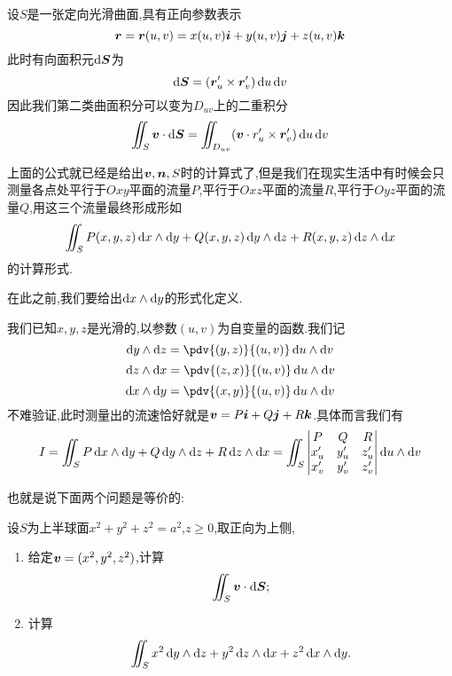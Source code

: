 设$S$是一张定向光滑曲面,具有正向参数表示
$$\bm{r} = \bm{r}(u,v) = x(u,v) \bm{i} + y(u,v) \bm{j} + z(u,v) \bm{k}$$
此时有向面积元$\operatorname{d\!} \bm{S}$为
$$\operatorname{d\!} \bm{S} = (\bm{r}_u' \times \bm{r}_v') \operatorname{d\!} u \operatorname{d\!} v$$
因此我们第二类曲面积分可以变为$D_{uv}$上的二重积分
$$\iint_S \bm{v} \cdot \operatorname{d\!} \bm{S} = \iint_{D_{uv}} ( \bm{v} \cdot r_u' \times \bm{r}_v') \operatorname{d\!} u \operatorname{d\!} v$$

\begin{remark}
    上面的公式就已经是给出$\bm{v},\bm{n},S$时的计算式了,但是我们在现实生活中有时候会只测量各点处平行于$Oxy$平面的流量$P$,平行于$Oxz$平面的流量$R$,平行于$Oyz$平面的流量$Q$,用这三个流量最终形成形如
    $$\iint_S P(x,y,z) \operatorname{d\!} x \wedge \operatorname{d\!} y + Q(x,y,z) \operatorname{d\!} y \wedge \operatorname{d\!} z + R(x,y,z) \operatorname{d\!} z \wedge \operatorname{d\!} x$$的计算形式.

    在此之前,我们要给出$\operatorname{d\!} x \wedge \operatorname{d\!} y$的形式化定义.
\end{remark}

我们已知$x,y,z$是光滑的,以参数$(u,v)$为自变量的函数.我们记
$$\dif y \wedge \dif z = \pdv{(y,z)}{(u,v)} \dif u \wedge \dif v$$
$$\dif z \wedge \dif x = \pdv{(z,x)}{(u,v)} \dif u \wedge \dif v$$
$$\dif x \wedge \dif y = \pdv{(x,y)}{(u,v)} \dif u \wedge \dif v$$
不难验证,此时测量出的流速恰好就是$\bm{v} = P \bm{i} + Q \bm{j} + R \bm{k}$.具体而言我们有
$$I = \iint_S P \dif x \wedge \dif y + Q \dif y \wedge \dif z + R \dif z \wedge \dif x = \iint_S \begin{vmatrix}
    P & Q & R\\
    x_u' & y_u' & z_u'\\
    x_v' & y_v' & z_v'\\
\end{vmatrix} \dif u \wedge \dif v$$

也就是说下面两个问题是等价的:
\begin{example}
    设$S$为上半球面$x^2 + y^2 + z^2 = a^2$,$z \geq 0$,取正向为上侧,
    \begin{enumerate}
        \item 给定$\bm{v} = (x^2,y^2,z^2)$,计算$$\iint_S \bm{v} \cdot \operatorname{d\!} \bm{S};$$
        \item 计算$$\iint_S x^2 \operatorname{d\!} y \wedge \operatorname{d\!} z + y^2 \operatorname{d\!} z \wedge \operatorname{d\!} x + z^2 \operatorname{d\!} x \wedge \operatorname{d\!} y.$$
    \end{enumerate}
\end{example}

